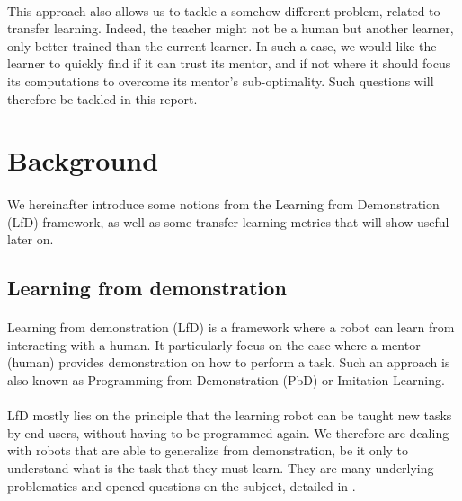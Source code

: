\documentclass[a4paper]{report}
\begin{document}
{{			\paragraph{} This approach also allows us to tackle a somehow different problem, related to transfer learning. Indeed, the teacher might not be a human but another learner, only better trained than the current learner. In such a case, we would like the learner to quickly find if it can trust its mentor, and if not where it should focus its computations to overcome its mentor's sub-optimality. Such questions will therefore be tackled in this report. 
		}
		\section{Background}
		{
			\paragraph{} We hereinafter introduce some notions from the Learning from Demonstration (LfD) framework, as well as some transfer learning metrics that will show useful later on. 
			\subsection{Learning from demonstration}
			{
				\label{subsection::lfd}
				\paragraph{} Learning from demonstration (LfD) is a framework where a robot can learn from interacting with a human. It particularly focus on the case where a mentor (human) provides demonstration on how to perform a task. Such an approach is also known as Programming from Demonstration (PbD) or Imitation Learning. 
				
				\paragraph{} LfD mostly lies on the principle that the learning robot can be taught new tasks by end-users, without having to be programmed again. We therefore are dealing with robots that are able to generalize from demonstration, be it only to understand what is the task that they must learn. They are many underlying problematics and opened questions on the subject, detailed in \cite{Billard2016}.
				
}}}
\end{document}
